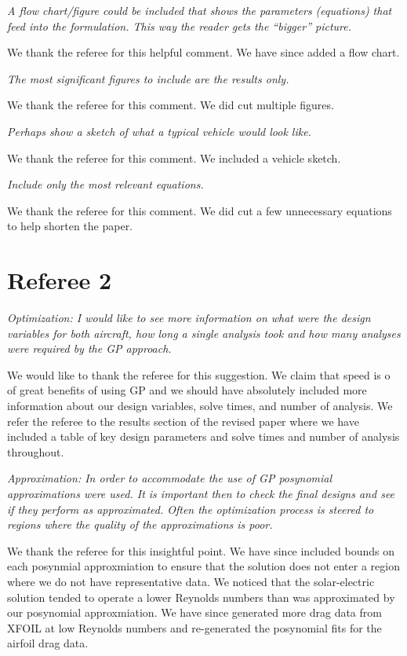 \documentclass[10pt, a4paper]{article}
\begin{document}
\emph{
A flow chart/figure could be included that shows the parameters (equations) that feed into the formulation. This way the reader gets the “bigger” picture. }

We thank the referee for this helpful comment.  We have since added a flow chart. 

\emph{
The most significant figures to include are the results only. }

We thank the referee for this comment.  We did cut multiple figures. 

\emph{
Perhaps show a sketch of what a typical vehicle would look like. }

We thank the referee for this comment.  We included a vehicle sketch. 

\emph{
Include only the most relevant equations.
}

We thank the referee for this comment.  We did cut a few unnecessary equations to help shorten the paper.

\section*{Referee 2}

\emph{Optimization: I would like to see more information on what were the design variables for both aircraft, how long a single analysis took and how many analyses were required by the GP approach.}

We would like to thank the referee for this suggestion.  We claim that speed is o of great benefits of using GP and we should have absolutely included more information about our design variables, solve times, and number of analysis.  We refer the referee to the results section of the revised paper where we have included a table of key design parameters and solve times and number of analysis throughout. 

\emph{Approximation: In order to accommodate the use of GP posynomial approximations were used. It is important then to check the final designs and see if they perform as approximated. Often the optimization process is steered to regions where the quality of the approximations is poor.}

We thank the referee for this insightful point.  We have since included bounds on each posynmial approxmiation to ensure that the solution does not enter a region where we do not have representative data.  We noticed that the solar-electric solution tended to operate a lower Reynolds numbers than was approximated by our posynomial approxmiation.  We have since generated more drag data from XFOIL at low Reynolds numbers and re-generated the posynomial fits for the airfoil drag data.
\end{document}
